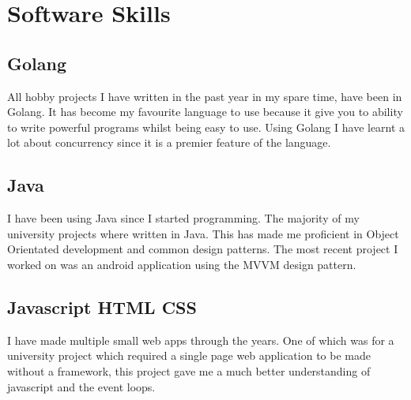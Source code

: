 \documentclass[a4paper]{cv}
\begin{document}
\begin{minipage}[t]{0.30\textwidth}

\section{Software Skills}
\subsection{Golang}
\begin{flushleft}
All hobby projects I have written in the past year in my spare time, have been in Golang. It has become my favourite language to use because it give you to ability to write powerful programs whilst being easy to use. Using Golang I have learnt a lot about concurrency since it is a premier feature of the language.
\end{flushleft}
\sectionspace

\subsection{Java}
\begin{flushleft}
I have been using Java since I started programming. The majority of my university projects where written in Java. This has made me proficient in Object Orientated development and common design patterns. The most recent project I worked on was an android application using the MVVM design pattern.
\end{flushleft}

\sectionspace
\subsection{Javascript \textbullet{} HTML \textbullet{} CSS}
\begin{flushleft}
I have made multiple small web apps through the years. One of which was for a university project which required a single page web application to be made without a framework, this project gave me a much better understanding of javascript and the event loops.
\end{flushleft}

\end{minipage}
\end{document}
